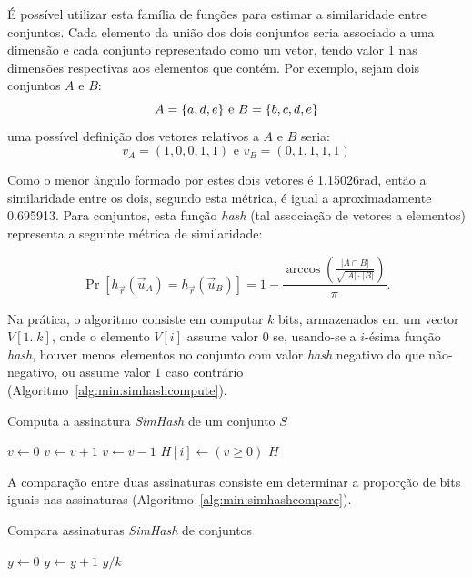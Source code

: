 É possível utilizar esta família de funções para estimar a similaridade entre conjuntos. Cada elemento da união dos dois conjuntos seria associado a uma dimensão e cada conjunto representado como um vetor, tendo valor 1 nas dimensões respectivas aos elementos que contém. Por exemplo, sejam dois conjuntos $A$ e $B$:
\[
    A = \{a, d, e\} \text{ e } \\
    B = \{b, c, d, e\}
\]
uma possível definição dos vetores relativos a $A$ e $B$ seria:
\[
    v_A = (1, 0, 0, 1, 1) \text{ e } 
    v_B = (0, 1, 1, 1, 1)
\]

Como o menor ângulo formado por estes dois vetores é 1,15026rad, então a similaridade entre os dois, segundo esta métrica, é igual a aproximadamente 0.695913. Para conjuntos, esta função \emph{hash} (tal associação de vetores a elementos) representa a seguinte métrica de similaridade:

\[
    \Pr[h_{\vec{r}}(\vec{u}_A) = h_{\vec{r}}(\vec{u}_B)] = 1 - \frac{\arccos \left( \frac{|A \cap B|}{\sqrt{|A| \cdot |B|}}\right)}{\pi}\text{.}
\]

Na prática, o algoritmo consiste em computar $k$ bits, armazenados em um vector $V[1..k]$, onde o elemento $V[i]$ assume valor $0$ se, usando-se a $i$-ésima função \emph{hash}, houver menos elementos no conjunto com valor \emph{hash} negativo do que não-negativo, ou assume valor $1$ caso contrário (Algoritmo~\ref{alg:min:simhashcompute}).

\begin{algorithm}
\linespread{1}\selectfont
\caption{Computa a assinatura \emph{SimHash} de um conjunto $S$}
\label{alg:min:simhashcompute}
\begin{algorithmic}[1]
        \State $v \gets 0$
                \State $v \gets v + 1$
            \Else
                \State $v \gets v - 1$
            \EndIf
	    \EndFor
        \State $H[i] \gets (v \geq 0)$
	\EndFor
	\Return $H$
\EndFunction
\end{algorithmic}
\end{algorithm}

A comparação entre duas assinaturas consiste em determinar a proporção de bits iguais nas assinaturas (Algoritmo~\ref{alg:min:simhashcompare}).

\begin{algorithm}
\linespread{1}\selectfont
\caption{Compara assinaturas \emph{SimHash} de conjuntos}
\label{alg:min:simhashcompare}
\begin{algorithmic}[1]
    \State $y \gets 0$
            \State $y \gets y + 1$
        \EndIf
	\EndFor
	\Return $y/k$
\EndFunction
\end{algorithmic}
\end{algorithm}

